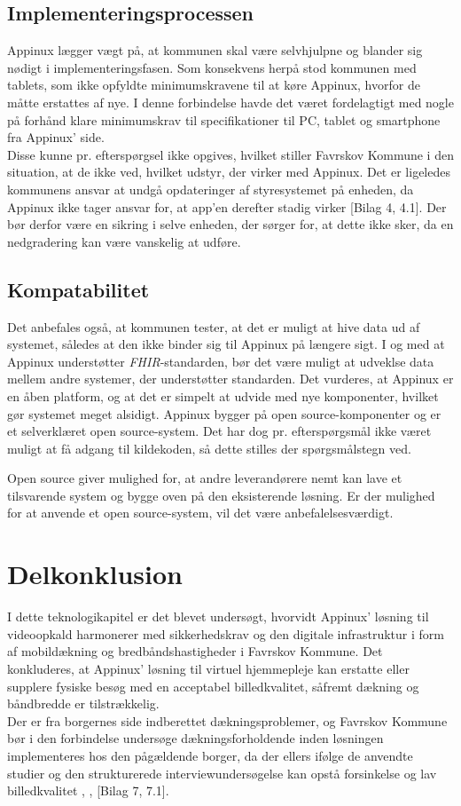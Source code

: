 \subsection{Implementeringsprocessen}
\label{sec:implementeringsprocessen}
Appinux lægger vægt på, at kommunen skal være selvhjulpne og blander sig nødigt i implementeringsfasen. Som konsekvens herpå stod kommunen med tablets, som ikke opfyldte minimumskravene til at køre Appinux, hvorfor de måtte erstattes af nye. I denne forbindelse havde det været fordelagtigt med nogle på forhånd klare minimumskrav til specifikationer til PC, tablet og smartphone fra Appinux' side.\\Disse kunne pr. efterspørgsel ikke opgives, hvilket stiller Favrskov Kommune i den situation, at de ikke ved, hvilket udstyr, der virker med Appinux. Det er ligeledes kommunens ansvar at undgå opdateringer af styresystemet på enheden, da Appinux ikke tager ansvar for, at app'en derefter stadig virker [Bilag 4, 4.1]. Der bør derfor være en sikring i selve enheden, der sørger for, at dette ikke sker, da en nedgradering kan være vanskelig at udføre.

\subsection{Kompatabilitet}
Det anbefales også, at kommunen tester, at det er muligt at hive data ud af systemet, således at den ikke binder sig til Appinux på længere sigt. I og med at Appinux understøtter \textit{FHIR}-standarden, bør det være muligt at udveklse data mellem andre systemer, der understøtter standarden. Det vurderes, at Appinux er en åben platform, og at det er simpelt at udvide med nye komponenter, hvilket gør systemet meget alsidigt. Appinux bygger på open source-komponenter og er et selverklæret open source-system. Det har dog pr. efterspørgsmål ikke været muligt at få adgang til kildekoden, så dette stilles der spørgsmålstegn ved.

Open source giver mulighed for, at andre leverandørere nemt kan lave et tilsvarende system og bygge oven på den eksisterende løsning. Er der mulighed for at anvende et open source-system, vil det være anbefalelsesværdigt.

\section{Delkonklusion}
I dette teknologikapitel er det blevet undersøgt, hvorvidt Appinux’ løsning til videoopkald harmonerer med sikkerhedskrav og den digitale infrastruktur i form af mobildækning og bredbåndshastigheder i Favrskov Kommune.
Det konkluderes, at Appinux’ løsning til virtuel hjemmepleje kan erstatte eller supplere fysiske besøg med en acceptabel billedkvalitet, såfremt dækning og båndbredde er tilstrækkelig.
\\Der er fra borgernes side indberettet dækningsproblemer, og Favrskov Kommune bør i den forbindelse undersøge dækningsforholdende inden løsningen implementeres hos den pågældende borger, da der ellers ifølge de anvendte studier og den strukturerede interviewundersøgelse kan opstå forsinkelse og lav billedkvalitet \cite{webrtcjournal}, \cite{arto}, [Bilag 7, 7.1].

